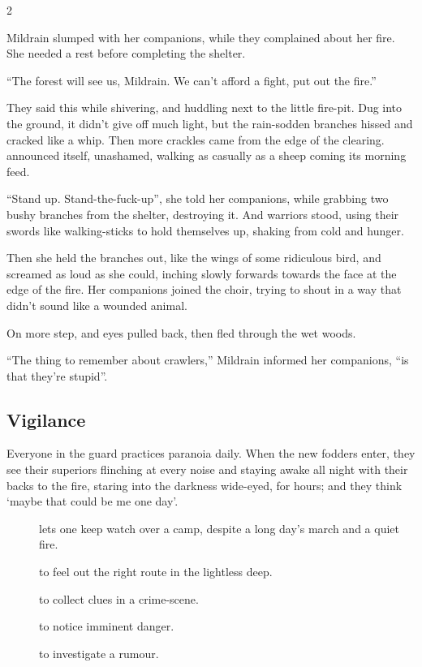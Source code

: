 \begin{multicols}{2}
\begin{exampletext}
  Mildrain slumped with her companions, while they complained about her fire.
  She needed a rest before completing the shelter.

  ``The forest will see us, Mildrain.
  We can't afford a fight, put out the fire.''

  They said this while shivering, and huddling next to the little fire-pit.
  Dug into the ground, it didn't give off much light, but the rain-sodden branches hissed and cracked like a whip.
  Then more crackles came from the edge of the clearing.
   announced itself, unashamed, walking as casually as a sheep coming its morning feed.

  ``Stand up.
  Stand-the-fuck-up'', she told her companions, while grabbing two bushy branches from the shelter, destroying it.
  And warriors stood, using their swords like walking-sticks to hold themselves up, shaking from cold and hunger.

  Then she held the branches out, like the wings of some ridiculous bird, and screamed as loud as she could, inching slowly forwards towards the face at the edge of the fire.
  Her companions joined the choir, trying to shout in a way that didn't sound like a wounded animal.

  On more step, and eyes pulled back, then fled through the wet woods.

  ``The thing to remember about \glspl{crawler},''
  Mildrain informed her companions,
  ``is that they're stupid''.

\end{exampletext}

\subsection{Vigilance}

Everyone in the \gls{guard} practices paranoia daily.
When the new \glspl{fodder} enter, they see their superiors flinching at every noise and staying awake all night with their backs to the fire, staring into the darkness wide-eyed, for hours; and they think `maybe that could be me one day'.

\begin{description}
  \item[]
    lets one keep watch over a camp, despite a long day's march and a quiet fire.

  \item[]
    to feel out the right route in the lightless \gls{deep}.
  \item[]
    to collect clues in a crime-scene.
  \item[]
    to notice imminent danger.
  \item[]
    to investigate a rumour.
\end{description}


\end{multicols}
